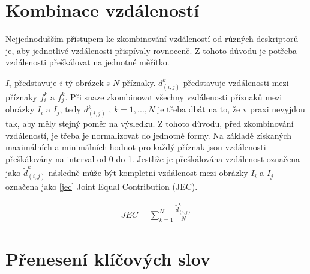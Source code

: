 \documentclass[czech,BP]{thesiskiv}
\begin{document}
\section{Kombinace vzdáleností}
\par Nejjednodušším přístupem ke zkombinování vzdáleností od různých deskriptorů je, aby jednotlivé vzdálenosti přispívaly rovnoceně. Z tohoto důvodu je potřeba vzdálenosti přeškálovat na jednotné měřítko.

\par $I_i$ představuje $i$-tý obrázek s $N$ příznaky. $d_{(i,j)}^k$ představuje vzdálenosti mezi příznaky $f_i^k$ a $f_j^k$. Při snaze zkombinovat všechny vzdálenosti příznaků mezi obrázky $I_i$ a $I_j$, tedy $d_{(i,j)}^k$ , $k=1, ..., N$  je třeba dbát na to, že v praxi nevyjdou tak, aby měly stejný poměr na výsledku. Z tohoto důvodu, před zkombinování vzdáleností, je třeba je normalizovat do jednotné formy. Na základě získaných maximálních a minimálních hodnot pro každý příznak jsou vzdálenosti přeškálovány na interval od 0 do 1. Jestliže je přeškálována vzdálenost označena jako ${\tilde{d}_{(i,j)}^k}$ následně může být kompletní vzdálenost mezi obrázky $I_i$ a $I_j$ označena jako \eqref{jec} Joint Equal Contribution (JEC).  

\begin{align}
   \label{jec} JEC = \sum_{k=1}^N\frac{\tilde{d}_{(i,j)}^k}{N}
\end{align}

\section{Přenesení klíčových slov}
\end{document}
